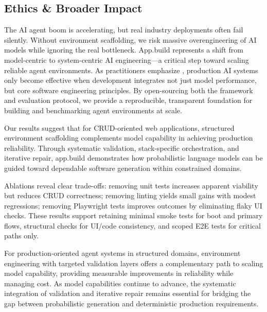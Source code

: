 \documentclass[conference]{IEEEtran}
\begin{document}
\subsection{Ethics \& Broader Impact}
\label{sec:broader-impact}

The AI agent boom is accelerating, but real industry deployments often fail silently. Without environment scaffolding, we risk massive overengineering of AI models while ignoring the real bottleneck. App.build represents a shift from model-centric to system-centric AI engineering—a critical step toward scaling reliable agent environments. As practitioners emphasize \cite{babushkin2025machine}, production AI systems only become effective when development integrates not just model performance, but core software engineering principles. By open-sourcing both the framework and evaluation protocol, we provide a reproducible, transparent foundation for building and benchmarking agent environments at scale.

Our results suggest that for CRUD-oriented web applications, structured environment scaffolding complements model capability in achieving production reliability. Through systematic validation, stack-specific orchestration, and iterative repair, app.build demonstrates how probabilistic language models can be guided toward dependable software generation within constrained domains.

Ablations reveal clear trade-offs: removing unit tests increases apparent viability but reduces CRUD correctness; removing linting yields small gains with modest regressions; removing Playwright tests improves outcomes by eliminating flaky UI checks. These results support retaining minimal smoke tests for boot and primary flows, structural checks for UI/code consistency, and scoped E2E tests for critical paths only.

For production-oriented agent systems in structured domains, environment engineering with targeted validation layers offers a complementary path to scaling model capability, providing measurable improvements in reliability while managing cost. As model capabilities continue to advance, the systematic integration of validation and iterative repair remains essential for bridging the gap between probabilistic generation and deterministic production requirements.
\end{document}
